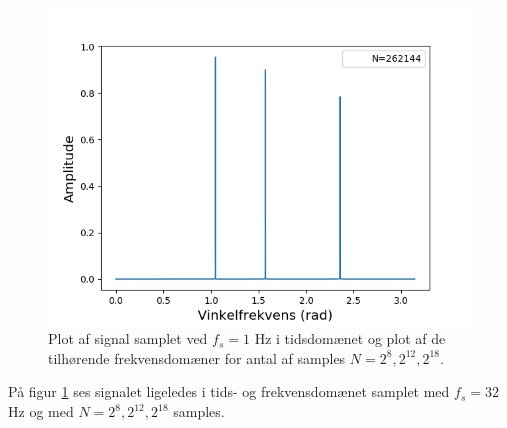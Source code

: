 \begin{figure}[H]
\begin{minipage}{0.49\textwidth}
\includegraphics[width=\textwidth]{figures/frekvensanalyse/1hz_freq3.png}
\end{minipage}
\caption{Plot af signal samplet ved $f_s=1$ Hz i tidsdomænet og plot af de tilhørende frekvensdomæner for antal af samples $N = 2^8, 2^{12}, 2^{18}$.}
\label{fig:1}
\end{figure}

På figur \ref{fig:1} ses signalet ligeledes i tids- og frekvensdomænet samplet med $f_s=32$ Hz og med $N=2^8, 2^{12}, 2^{18}$ samples.


